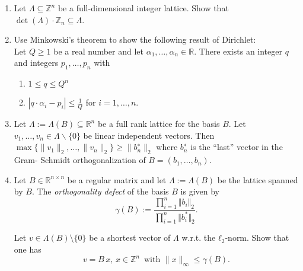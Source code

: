 \documentclass[11pt,a4paper]{article}
\renewcommand{\leq}{\leqslant}
\renewcommand{\geq}{\geqslant}
\begin{document}
\begin{enumerate}
  
\item Let  $Λ ⊆ ℤ^n$ be a full-dimensional integer lattice.  Show that $\det(Λ) \cdot \mathbb{Z}_n ⊆ Λ$.



\item Use Minkowski’s theorem to show the following result of Dirichlet: \\
Let $Q\geq1$ be a real number and let $α_1,\hdots,α_n ∈\mathbb{R}$. There exists an integer $q$ and integers $p_1,\hdots,p_n$ with
\begin{enumerate}
    \item $1 \leq q \leq Q^n$
    \item $|q\cdot \alpha_i - p_i | \leq \frac{1}{Q}$ for $i = 1, \hdots, n$.  
\end{enumerate}

\item Let $Λ := Λ(B) ⊆ \mathbb{R}^n$ be a full rank lattice for the basis $B$. Let $v_1,\hdots,v_n ∈ Λ\backslash \{0\}$ be linear independent vectors. Then $\max\{∥v_1∥_2,\hdots,∥v_n∥_2\} \geq ∥b^∗_n∥_2$ where $b^∗_n$ is the “last” vector in the Gram- Schmidt orthogonalization of $B = (b_1,\hdots,b_n)$.

\item Let $B ∈ \mathbb{R}^{n×n}$ be a regular matrix and let $Λ := Λ(B)$ be the  lattice spanned by $B$. The \emph{orthogonality defect} of the basis $B$ is given by 
  $$\gamma(B) := \frac{\prod_{i=1}^n \Vert b_i \Vert_2 }{\prod_{i = 1}^n \Vert b^\ast_i \Vert_2 }.$$

  Let $v ∈ Λ(B) \setminus \{0\}$ be a shortest vector of $Λ$ w.r.t. the $ℓ_2$-norm. Show that one has
  \begin{displaymath}
    v = B \, x, \, x ∈ℤ^n  \, \text{ with } \|x\|_∞ ≤ γ(B).  
  \end{displaymath}


  

  

\end{enumerate}



%
%


 
\end{document}
